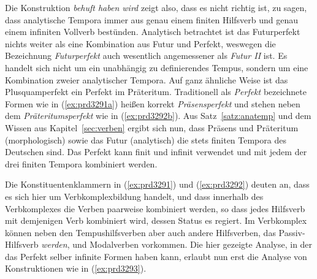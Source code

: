 
Die Konstruktion \textit{behuft haben wird} zeigt also, dass es nicht richtig ist, zu sagen, dass analytische Tempora immer aus genau einem finiten Hilfsverb und genau einem infiniten Vollverb bestünden.
Analytisch betrachtet ist das Futurperfekt nichts weiter als eine Kombination aus Futur und Perfekt, weswegen die Bezeichnung \textit{Futurperfekt} auch wesentlich angemessener als \textit{Futur II} ist.
Es handelt sich nicht um ein unabhängig zu definierendes Tempus, sondern um eine Kombination zweier analytischer Tempora.
Auf ganz ähnliche Weise ist das Plusquamperfekt ein Perfekt im Präteritum.
Traditionell als \textit{Perfekt} bezeichnete Formen wie in (\ref{ex:prd3291a}) heißen korrekt \textit{Präsensperfekt} und stehen neben dem \textit{Präteritumsperfekt} wie in (\ref{ex:prd3292b}).
Aus Satz~\ref{satz:anatemp} und dem Wissen aus Kapitel~\ref{sec:verben} ergibt sich nun, dass Präsens und Präteritum (morphologisch) sowie das Futur (analytisch) die stets finiten Tempora des Deutschen sind.
Das Perfekt kann finit und infinit verwendet und mit jedem der drei finiten Tempora kombiniert werden.


Die Konstituentenklammern in (\ref{ex:prd3291}) und (\ref{ex:prd3292}) deuten an, dass es sich hier um Verbkomplexbildung handelt, und dass innerhalb des Verbkomplexes die Verben paarweise kombiniert werden, so dass jedes Hilfsverb mit demjenigen Verb kombiniert wird, dessen Status es regiert.
Im Verbkomplex können neben den Tempushilfsverben aber auch andere Hilfsverben, \zB das Passiv-Hilfsverb \textit{werden}, und Modalverben vorkommen.
Die hier gezeigte Analyse, in der das Perfekt selber infinite Formen haben kann, erlaubt nun erst die Analyse von Konstruktionen wie in (\ref{ex:prd3293}).

\begin{exe}
  \ex\label{ex:prd3293} 
  \begin{xlist}
  \end{xlist}
\end{exe}

